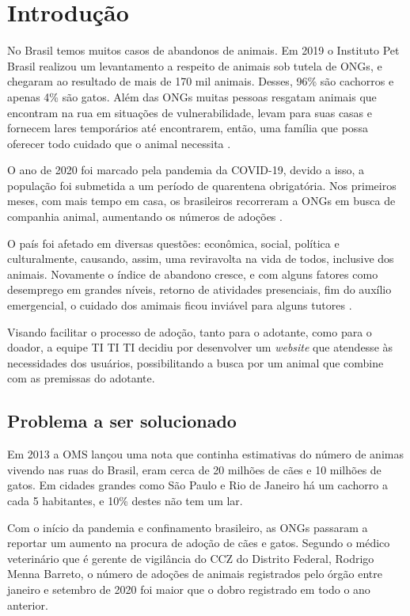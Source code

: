 \chapter[Introdução]{Introdução}
No Brasil temos muitos casos de abandonos de animais. Em 2019 o Instituto Pet Brasil realizou um levantamento a respeito de animais sob tutela de \ac{ONGs}, e chegaram ao resultado de mais de 170 mil animais. Desses, 96\% são cachorros e apenas 4\% são gatos. Além das \ac{ONGs} muitas pessoas resgatam animais que encontram na rua em situações de vulnerabilidade, levam para suas casas e fornecem lares temporários até encontrarem, então, uma família que possa oferecer todo cuidado que o animal necessita \cite{tutelaONG}.

O ano de 2020 foi marcado pela pandemia da \gls{COVID-19}, devido a isso, a população foi submetida a um período de quarentena obrigatória. Nos primeiros meses, com mais tempo em casa, os brasileiros recorreram a \ac{ONGs} em busca de companhia animal, aumentando os números de adoções \cite{adocao}.

O país foi afetado em diversas questões: econômica, social, política e culturalmente, causando, assim, uma reviravolta na vida de todos, inclusive dos animais. Novamente o índice de abandono cresce, e com alguns fatores como desemprego em grandes níveis, retorno de atividades presenciais, fim do auxílio emergencial, o cuidado dos amimais ficou inviável para alguns tutores \cite{abandono_pandemia}. 

Visando facilitar o processo de adoção, tanto para o adotante, como para o doador, a equipe TI TI TI decidiu por desenvolver um \textit{website} que atendesse às necessidades dos usuários, possibilitando a busca por um animal que combine com as premissas do adotante.

\section{Problema a ser solucionado}
Em 2013 a \ac{OMS} lançou uma nota que continha estimativas do número de animas vivendo nas ruas do Brasil, eram cerca de 20 milhões de cães e 10 milhões de gatos. Em cidades grandes como São Paulo e Rio de Janeiro há um cachorro a cada 5 habitantes, e 10\% destes não tem um lar.

Com o início da pandemia e confinamento brasileiro, as \ac{ONGs} passaram a reportar um aumento na procura de adoção de cães e gatos. Segundo o médico veterinário que é gerente de vigilância do \ac{CCZ} do Distrito Federal, Rodrigo Menna Barreto, o número de adoções de animais registrados pelo órgão entre janeiro e setembro de 2020 foi maior que o dobro registrado em todo o ano anterior.

